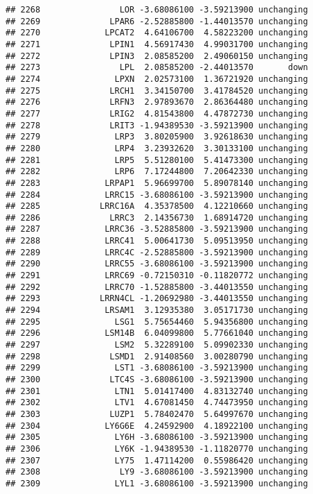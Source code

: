 \documentclass[]{article}
\begin{document}
\begin{verbatim}
## 2268                LOR -3.68086100 -3.59213900 unchanging
## 2269              LPAR6 -2.52885800 -1.44013570 unchanging
## 2270             LPCAT2  4.64106700  4.58223200 unchanging
## 2271              LPIN1  4.56917430  4.99031700 unchanging
## 2272              LPIN3  2.08585200  2.49060150 unchanging
## 2273                LPL  2.08585200 -2.44013570       down
## 2274               LPXN  2.02573100  1.36721920 unchanging
## 2275              LRCH1  3.34150700  3.41784520 unchanging
## 2276              LRFN3  2.97893670  2.86364480 unchanging
## 2277              LRIG2  4.81543800  4.47872730 unchanging
## 2278              LRIT3 -1.94389530 -3.59213900 unchanging
## 2279               LRP3  3.80205900  3.92618630 unchanging
## 2280               LRP4  3.23932620  3.30133100 unchanging
## 2281               LRP5  5.51280100  5.41473300 unchanging
## 2282               LRP6  7.17244800  7.20642330 unchanging
## 2283             LRPAP1  5.96699700  5.89078140 unchanging
## 2284             LRRC15 -3.68086100 -3.59213900 unchanging
## 2285            LRRC16A  4.35378500  4.12210660 unchanging
## 2286              LRRC3  2.14356730  1.68914720 unchanging
## 2287             LRRC36 -3.52885800 -3.59213900 unchanging
## 2288             LRRC41  5.00641730  5.09513950 unchanging
## 2289             LRRC4C -2.52885800 -3.59213900 unchanging
## 2290             LRRC55 -3.68086100 -3.59213900 unchanging
## 2291             LRRC69 -0.72150310 -0.11820772 unchanging
## 2292             LRRC70 -1.52885800 -3.44013550 unchanging
## 2293            LRRN4CL -1.20692980 -3.44013550 unchanging
## 2294             LRSAM1  3.12935380  3.05171730 unchanging
## 2295               LSG1  5.75654460  5.94356800 unchanging
## 2296             LSM14B  6.04099800  5.77661040 unchanging
## 2297               LSM2  5.32289100  5.09902330 unchanging
## 2298              LSMD1  2.91408560  3.00280790 unchanging
## 2299               LST1 -3.68086100 -3.59213900 unchanging
## 2300              LTC4S -3.68086100 -3.59213900 unchanging
## 2301               LTN1  5.01417400  4.83132740 unchanging
## 2302               LTV1  4.67081450  4.74473950 unchanging
## 2303              LUZP1  5.78402470  5.64997670 unchanging
## 2304             LY6G6E  4.24592900  4.18922100 unchanging
## 2305               LY6H -3.68086100 -3.59213900 unchanging
## 2306               LY6K -1.94389530 -1.11820770 unchanging
## 2307               LY75  1.47114200  0.55986420 unchanging
## 2308                LY9 -3.68086100 -3.59213900 unchanging
## 2309               LYL1 -3.68086100 -3.59213900 unchanging

\end{verbatim}
\end{document}
